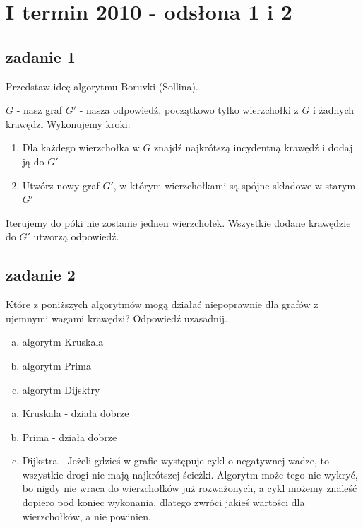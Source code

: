 \chapter{I termin 2010 - odsłona 1 i 2}
\section{zadanie 1}
\begin{framed}
Przedstaw ideę algorytmu Boruvki (Sollina).
\end{framed}
$G$ - nasz graf
$G'$ - nasza odpowiedź, początkowo tylko wierzchołki z $G$ i żadnych krawędzi
Wykonujemy kroki:
\begin{enumerate}
\item Dla każdego wierzchołka w $G$ znajdź najkrótszą incydentną krawędź i dodaj ją do $G'$
\item Utwórz nowy graf $G'$, w którym wierzchołkami są spójne składowe w starym $G'$
 \end{enumerate}
Iterujemy do póki nie zostanie jednen wierzchołek. Wszystkie dodane krawędzie do $G'$ utworzą odpowiedź.
\section{zadanie 2}
\begin{framed}
Które z poniższych algorytmów mogą działać niepoprawnie dla grafów z ujemnymi wagami krawędzi? Odpowiedź uzasadnij.
\begin{enumerate}[a)]
	\item algorytm Kruskala
	\item algorytm Prima
	\item algorytm Dijsktry
\end{enumerate}
\end{framed}

\begin{enumerate}[a)]
\item Kruskala - działa dobrze
\item Prima - działa dobrze
\item Dijkstra - Jeżeli gdzieś w grafie występuje cykl o negatywnej wadze, to wszystkie drogi nie mają najkrótszej ścieżki. Algorytm może tego nie wykryć, bo nigdy nie wraca do wierzchołków już rozważonych, a cykl możemy znaleść dopiero pod koniec wykonania, dlatego zwróci jakieś wartości dla wierzchołków, a nie powinien.
\end{enumerate}

